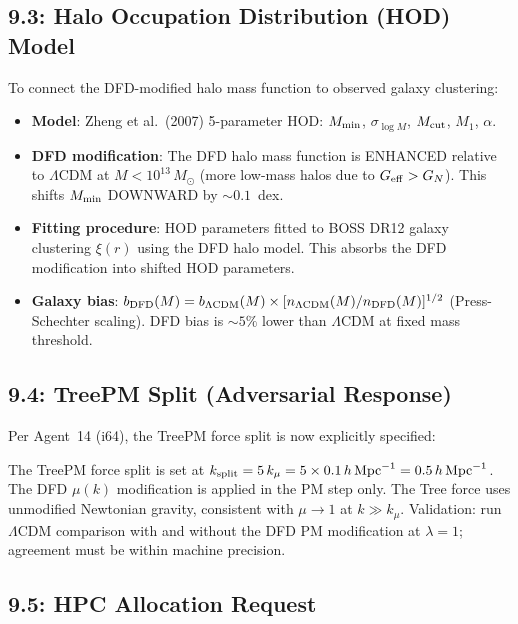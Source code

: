 \documentclass[11pt,a4paper]{article}
\begin{document}
\subsection{9.3: Halo Occupation Distribution (HOD) Model}

To connect the DFD-modified halo mass function to observed galaxy clustering:

\begin{itemize}
\item \textbf{Model}: Zheng et al.\ (2007) 5-parameter HOD: $M_{\rm min}$, $\sigma_{\log M}$, $M_{\rm cut}$, $M_1$, $\alpha$.
\item \textbf{DFD modification}: The DFD halo mass function is ENHANCED relative to $\Lambda$CDM at $M < 10^{13}\,M_\odot$ (more low-mass halos due to $G_{\rm eff} > G_N$). This shifts $M_{\rm min}$ DOWNWARD by $\sim 0.1$~dex.
\item \textbf{Fitting procedure}: HOD parameters fitted to BOSS DR12 galaxy clustering $\xi(r)$ using the DFD halo model. This absorbs the DFD modification into shifted HOD parameters.
\item \textbf{Galaxy bias}: $b_{\rm DFD}(M) = b_{\Lambda\text{CDM}}(M) \times [n_{\Lambda\text{CDM}}(M)/n_{\rm DFD}(M)]^{1/2}$ (Press-Schechter scaling). DFD bias is $\sim 5\%$ lower than $\Lambda$CDM at fixed mass threshold.
\end{itemize}

\subsection{9.4: TreePM Split (Adversarial Response)}

Per Agent~14 (i64), the TreePM force split is now explicitly specified:

\begin{tcolorbox}[colback=blue!5!white, colframe=blue!60!black, title={TreePM Split Specification}]
The TreePM force split is set at $k_{\rm split} = 5\,k_\mu = 5 \times 0.1\,h\,\text{Mpc}^{-1} = 0.5\,h\,\text{Mpc}^{-1}$. The DFD $\mu(k)$ modification is applied in the PM step only. The Tree force uses unmodified Newtonian gravity, consistent with $\mu \to 1$ at $k \gg k_\mu$. Validation: run $\Lambda$CDM comparison with and without the DFD PM modification at $\lambda = 1$; agreement must be within machine precision.
\end{tcolorbox}

\subsection{9.5: HPC Allocation Request}
\end{document}
